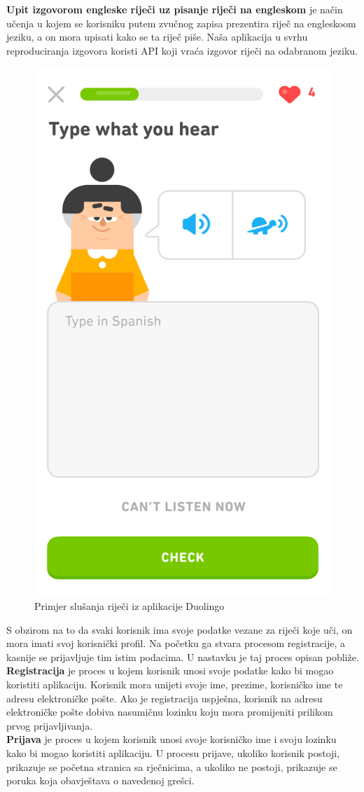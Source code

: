 		\textbf{Upit izgovorom engleske riječi uz pisanje riječi na engleskom} je način učenja u kojem se korisniku putem zvučnog zapisa prezentira riječ na engleskoom jeziku, a on mora upisati kako se ta riječ piše. Naša aplikacija u svrhu reproduciranja izgovora koristi API koji vraća izgovor riječi na odabranom jeziku.
		\begin{figure}[H]
			\centering
			\includegraphics[width=0.4\linewidth]{slike/Duolingo.png}
			\caption{Primjer slušanja riječi iz aplikacije Duolingo}
			\label{fig:rijecnik}
		\end{figure}
		\noindent S obzirom na to da svaki korisnik ima svoje podatke vezane za riječi koje uči, on mora imati svoj korisnički profil. Na početku ga stvara procesom registracije, a kasnije se prijavljuje tim istim podacima. U nastavku je taj proces opisan pobliže.
		\\

		\textbf{Registracija} je proces u kojem korisnik unosi svoje podatke kako bi mogao koristiti aplikaciju. Korisnik mora unijeti svoje ime, prezime, korisničko ime te adresu elektroničke pošte.
		Ako je registracija uspješna, korisnik na adresu elektroničke pošte dobiva nasumičnu lozinku koju mora promijeniti prilikom prvog prijavljivanja.
		\\
		
		\textbf{Prijava} je proces u kojem korisnik unosi svoje korisničko ime i svoju lozinku kako bi mogao koristiti aplikaciju. U procesu prijave, ukoliko korisnik postoji, prikazuje se početna stranica sa rječnicima, a ukoliko ne postoji, prikazuje se poruka  koja obavještava o navedenoj grešci.
		\\

